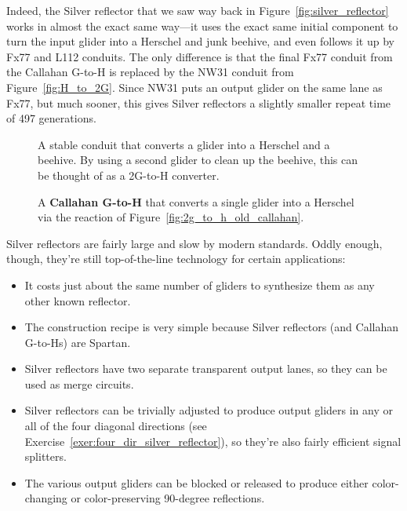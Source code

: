 Indeed, the Silver reflector that we saw way back in Figure~\ref{fig:silver_reflector} works in almost the exact same way---it uses the exact same initial component to turn the input glider into a Herschel and junk beehive, and even follows it up by Fx77 and L112 conduits. The only difference is that the final Fx77 conduit from the Callahan G-to-H is replaced by the NW31 conduit from Figure~\ref{fig:H_to_2G}. Since NW31 puts an output glider on the same lane as Fx77, but much sooner, this gives Silver reflectors a slightly smaller repeat time of 497 generations.

\begin{figure}[!htb]
	\centering
	\begin{minipage}[b]{0.43\textwidth}
		\centering
		\caption{A stable conduit that converts a glider into a Herschel and a beehive. By using a second glider to clean up the beehive, this can be thought of as a 2G-to-H converter.}\label{fig:2g_to_h_old_callahan}
	\end{minipage} \hfill \begin{minipage}[b]{0.53\textwidth}
		\centering
		\caption{A \textbf{Callahan G-to-H} that converts a single glider into a Herschel via the reaction of Figure~\ref{fig:2g_to_h_old_callahan}.}\label{fig:callahan_g_to_h}
	\end{minipage}
\end{figure}

Silver reflectors are fairly large and slow by modern standards. Oddly enough, though, they're still top-of-the-line technology for certain applications:\smallskip

\begin{itemize}
	\item It costs just about the same number of gliders to synthesize them as any other known reflector.\smallskip
	
	\item The construction recipe is very simple because Silver reflectors (and Callahan G-to-Hs) are Spartan.\smallskip
	
	\item Silver reflectors have two separate transparent output lanes, so they can be used as merge circuits.\smallskip
	
	\item Silver reflectors can be trivially adjusted to produce output gliders in any or all of the four diagonal directions (see Exercise~\ref{exer:four_dir_silver_reflector}), so they're also fairly efficient signal splitters.\smallskip
	
	\item The various output gliders can be blocked or released to produce either color-changing or color-preserving 90-degree reflections.\smallskip
\end{itemize}

